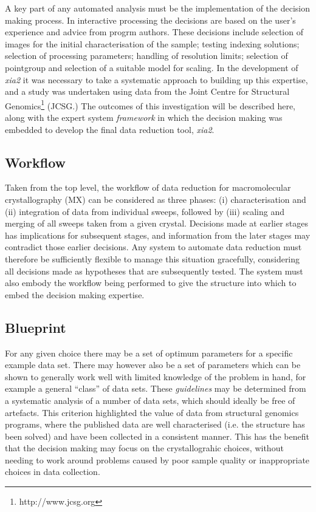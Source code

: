 \documentclass[preprint,pdf]{iucr}
\begin{document}
A key part of any automated analysis must be the implementation of the
decision making process. In interactive processing the decisions are
based on the user's experience and advice from progrm authors. These
decisions include selection of images for the initial characterisation
of the sample; testing indexing solutions; selection of processing
parameters; handling of resolution limits; selection of pointgroup and
selection of a suitable model for scaling. In the development of
\emph{xia2} it was necessary to take a systematic approach to building
up this expertise, and a study was undertaken using data from the
Joint Centre
for Structural Genomics\footnote{http://www.jcsg.org} (JCSG.) The
outcomes of this investigation will be described here, along with the
expert system \emph{framework} in which the decision making was
embedded to develop the final data reduction tool, \emph{xia2}.

\subsection{Workflow}

Taken from the top level, the workflow of data reduction for
macromolecular crystallography (MX) can be considered as three phases:
(i) characterisation and (ii) integration of data from individual sweeps,
followed by (iii) scaling and merging of all sweeps taken from a given
crystal. Decisions made at earlier stages has implications for
subsequent stages, and information from the later stages may
contradict those earlier decisions. Any system to automate data
reduction must therefore be sufficiently flexible to manage this
situation gracefully, considering all decisions made as hypotheses
that are subsequently tested. The system must also embody the workflow being
performed to give the structure into which to embed the decision
making expertise.

\subsection{Blueprint}

For any given choice there may be a set of optimum parameters for a
specific example data set. There may however also be a set of
parameters which can be 
shown to generally work well with limited knowledge of the problem in
hand, for example a general ``class'' of data sets.
These \emph{guidelines} may be determined from a systematic
analysis of a number of data sets, which should ideally be free of
artefacts. This criterion highlighted the value of data from 
structural genomics programs, where the published data are well
characterised (i.e. the structure has been solved) and have been
collected in a consistent manner. This has the benefit that the
decision making may focus on the crystallograhic choices, without
needing to work around problems caused by poor sample quality or
inappropriate choices in data collection. 
\end{document}
